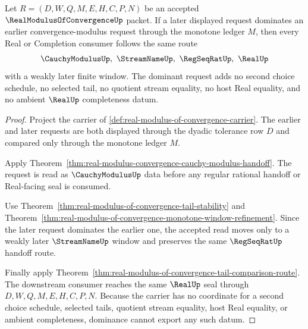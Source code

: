 \begin{theorem}
\label{thm:real-modulus-of-convergence-tail-dominance}
Let $R=(D,W,Q,M,E,H,C,P,N)$ be an accepted $\RealModulusOfConvergenceUp$ packet. If a later displayed request dominates an earlier convergence-modulus request through the monotone ledger $M$, then every Real or Completion consumer follows the same route
$$
\CauchyModulusUp,\ \StreamNameUp,\ \RegSeqRatUp,\ \RealUp
$$
with a weakly later finite window. The dominant request adds no second choice schedule, no selected tail, no quotient stream equality, no host Real equality, and no ambient $\RealUp$ completeness datum.
\end{theorem}
\begin{proof}
Project the carrier of \autoref{def:real-modulus-of-convergence-carrier}. The earlier and later requests are both displayed through the dyadic tolerance row $D$ and compared only through the monotone ledger $M$.

Apply Theorem~\ref{thm:real-modulus-convergence-cauchy-modulus-handoff}. The request is read as $\CauchyModulusUp$ data before any regular rational handoff or Real-facing seal is consumed.

Use Theorem~\ref{thm:real-modulus-of-convergence-tail-stability} and Theorem~\ref{thm:real-modulus-of-convergence-monotone-window-refinement}. Since the later request dominates the earlier one, the accepted read moves only to a weakly later $\StreamNameUp$ window and preserves the same $\RegSeqRatUp$ handoff route.

Finally apply Theorem~\ref{thm:real-modulus-of-convergence-tail-comparison-route}. The downstream consumer reaches the same $\RealUp$ seal through $D,W,Q,M,E,H,C,P,N$. Because the carrier has no coordinate for a second choice schedule, selected tails, quotient stream equality, host Real equality, or ambient completeness, dominance cannot export any such datum.
\end{proof}

